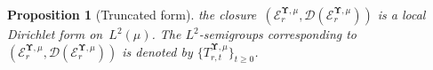 \documentclass[11pt,letterpaper]{amsart}
\newcommand{\rep}[1]{\hat #1}
\renewcommand{\complement}{\mathrm{c}}
\newcommand{\dom}[1]{\mathcal D(#1)}
\newcommand{\sem}[1]{\{#1\}_{t \ge 0}}
\newcommand{\diff}{\mathop{}\!\mathrm{d}}
\newcommand{\comma}{\,\,\mathrm{,}\;\,}
\newcommand{\fstop}{\,\,\mathrm{.}}
\newcommand{\cdc}{\Gamma}
\newcommand{\QP}{{\mu}}
\newcommand{\dUpsilon}{{\mathbf \Upsilon}}
\newcommand{\U}{\dUpsilon}
\newcommand{\E}{\mathcal E}
\renewcommand{\1}{\mathbf 1}
\renewcommand{\msE}{\mathscr K}
\numberwithin{equation}{section}
\theoremstyle{plain}
\newtheorem{prop}[thm]{Proposition}%
\newtheorem{lem}[thm]{Lemma}%
\theoremstyle{definition}
\theoremstyle{remark}
\begin{document}
\begin{prop}[Truncated form]
the closure~$(\E_r^{\U, \QP}, \dom{\E_r^{\U, \QP}})$ is a local Dirichlet form on~$L^2(\mu)$. The $L^2$-semigroups corresponding to $(\E_{r}^{\U, \mu}, \dom{\E_{r}^{\U, \mu}})$ is denoted by $\sem{T_{r, t}^{\U, \QP}}$. 
\end{prop}
%
%
\end{document}
